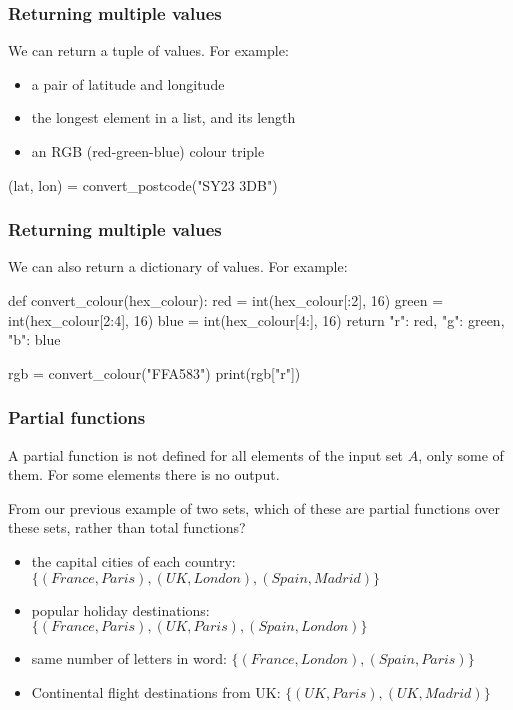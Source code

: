 \documentclass{beamer}
\begin{document}
\begin{frame}[fragile]
\frametitle{Returning multiple values}
We can return a tuple of values. For example:

\begin{itemize}
\item a pair of latitude and longitude
\item the longest element in a list, and its length
\item an RGB (red-green-blue) colour triple
\end{itemize}

\begin{code}
(lat, lon) = convert_postcode("SY23 3DB")
\end{code}
\end{frame}

\begin{frame}[fragile]
\frametitle{Returning multiple values}
We can also return a dictionary of values. For example:

\begin{code}
def convert_colour(hex_colour):
   red = int(hex_colour[:2], 16)
   green = int(hex_colour[2:4], 16)
   blue = int(hex_colour[4:], 16)
   return { "r": red, "g": green, "b": blue }

rgb = convert_colour("FFA583")
print(rgb["r"])
\end{code}
\end{frame}


\begin{frame}[fragile]
\frametitle{Partial functions}
A partial function is not defined for all elements of the input set
$A$, only some
of them. For some elements there is no output. 

From our previous example of two sets, which of these are partial
functions over these sets, rather than total functions?
 
\begin{itemize} 
\item the capital cities of each country: $\{(France, Paris), (UK,
  London), (Spain, Madrid) \}$
\item popular holiday destinations: $\{ (France, Paris), (UK, Paris),
  (Spain, London) \}$
\item same number of letters in word: $\{ (France, London), (Spain,
  Paris) \}$
\item Continental flight destinations from UK: $\{ (UK, Paris), (UK, Madrid) \}$
\end{itemize}
\end{frame}
\end{document}
